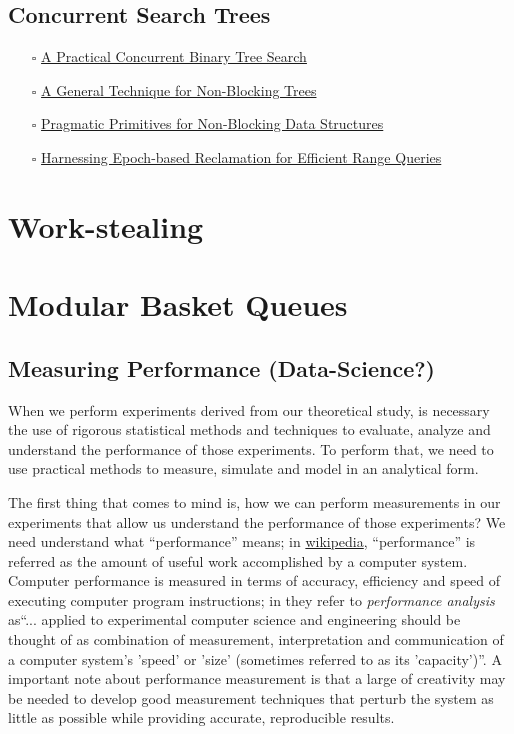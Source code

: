 \documentclass[openany, a4paper]{book}
\theoremstyle{break}
\theoremstyle{example}
\theoremstyle{note}
\theoremstyle{break}
\theoremstyle{exercise}
\begin{document}
\chapter{Concurrent Search Trees}
\label{sec:org91767ed}

\begin{itemize}
\item[{$\square$}] \href{http://ppl.stanford.edu/papers/ppopp207-bronson.pdf}{A Practical Concurrent Binary Tree Search}
\item[{$\square$}] \href{https://arxiv.org/abs/1712.06687}{A General Technique for Non-Blocking Trees}
\item[{$\square$}] \href{https://arxiv.org/abs/1712.06688}{Pragmatic Primitives for Non-Blocking Data Structures}
\item[{$\square$}] \href{http://www.cs.toronto.edu/\~tabrown/ebrrq/paper.ppopp18.pdf}{Harnessing Epoch-based Reclamation for Efficient Range Queries}
\end{itemize}


\part{Work-stealing}
\label{sec:orga52cc72}




\part{Modular Basket Queues}
\label{sec:org1d3c574}

\chapter{Measuring Performance (Data-Science?)}
\label{sec:org0bd3bfe}

When we perform experiments derived from our theoretical study, is necessary
the use of rigorous statistical methods and techniques to evaluate, analyze
and understand the performance of those experiments. To perform that, we need
to use practical methods to measure, simulate and model in an analytical
form.

The first thing that comes to mind is, how we can perform measurements in our
experiments that allow us understand the performance of those experiments? We
need understand what ``performance'' means; in \href{https://en.wikipedia.org/wiki/Computer\_performance}{wikipedia}, ``performance'' is
referred as the amount of useful work accomplished by a computer
system. Computer performance is measured in terms of accuracy, efficiency and
speed of executing computer program instructions; in \cite{lilja2005measuring}
they refer to \emph{performance analysis} as``... applied to experimental computer
science and engineering should be thought of as combination of measurement,
interpretation and communication of a computer system's 'speed' or 'size'
(sometimes referred to as its 'capacity')''. A important note about
performance measurement is that a large of creativity may be needed to
develop good measurement techniques that perturb the system as little as
possible while providing accurate, reproducible
results\cite{lilja2005measuring}.
\end{document}
